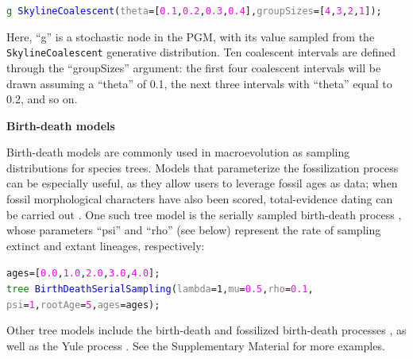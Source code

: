 \documentclass[10pt,letterpaper,table]{article}
\begin{document}
{\small
  \begin{alltt}
    \textcolor{green}{g} ~ \textcolor{blue}{SkylineCoalescent}(\textcolor{gray}{theta}=[\textcolor{magenta}{0.1}, \textcolor{magenta}{0.2}, \textcolor{magenta}{0.3}, \textcolor{magenta}{0.4}], \textcolor{gray}{groupSizes}=[\textcolor{magenta}{4},\textcolor{magenta}{3},\textcolor{magenta}{2},\textcolor{magenta}{1}]);
  \end{alltt}
}

Here, ``g'' is a stochastic node in the PGM, with its value sampled from the \texttt{SkylineCoalescent} generative distribution. Ten coalescent intervals are defined through the ``groupSizes'' argument: the first four coalescent intervals will be drawn assuming a ``theta'' of 0.1, the next three intervals with ``theta'' equal to 0.2, and so on.
\newline

\noindent \textbf{Birth-death models}

Birth-death models are commonly used in macroevolution as sampling distributions for species trees. Models that parameterize the fossilization process can be especially useful, as they allow users to leverage fossil ages as data; when fossil morphological characters have also been scored, total-evidence dating can be carried out \cite{ogilvie21}. One such tree model is the serially sampled birth-death process \cite{stadler2013dating}, whose parameters ``psi'' and ``rho'' (see below) represent the rate of sampling extinct and extant lineages, respectively:

{\small
  \begin{alltt}
    ages = [\textcolor{magenta}{0.0}, \textcolor{magenta}{1.0}, \textcolor{magenta}{2.0}, \textcolor{magenta}{3.0}, \textcolor{magenta}{4.0}];
    \textcolor{green}{tree} ~ \textcolor{blue}{BirthDeathSerialSampling}(\textcolor{gray}{lambda}=1, \textcolor{gray}{mu}=\textcolor{magenta}{0.5}, \textcolor{gray}{rho}=\textcolor{magenta}{0.1},
    \textcolor{gray}{psi}=\textcolor{magenta}{1}, \textcolor{gray}{rootAge}=\textcolor{magenta}{5}, \textcolor{gray}{ages}=ages);
  \end{alltt}
}

Other tree models include the birth-death \cite{kendall1948generalized} and fossilized birth-death processes \cite{heath2014fossilized}, as well as the Yule process \cite{yule1925ii}. See the Supplementary Material for more examples.

\end{document}
